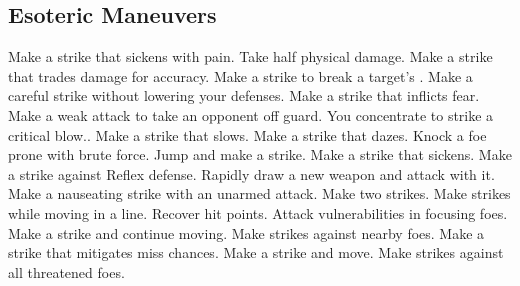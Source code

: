 
\small
\subsection{Esoteric Maneuvers}\label{Esoteric Maneuvers}
\begin{spelllist}
 Make a strike that sickens with pain.
 Take half physical damage.
 Make a strike that trades damage for accuracy.
 Make a strike to break a target's .
 Make a careful strike without lowering your defenses.
 Make a strike that inflicts fear.
 Make a weak attack to take an opponent off guard.
 You concentrate to strike a critical blow..
 Make a strike that slows.
 Make a strike that dazes.
 Knock a foe prone with brute force.
 Jump and make a strike.
 Make a strike that sickens.
 Make a strike against Reflex defense.
 Rapidly draw a new weapon and attack with it.
 Make a nauseating strike with an unarmed attack.
 Make two strikes.
 Make strikes while moving in a line.
 Recover hit points.
 Attack vulnerabilities in focusing foes.
 Make a strike and continue moving.
 Make strikes against nearby foes.
 Make a strike that mitigates miss chances.
 Make a strike and move.
 Make strikes against all threatened foes.
\end{spelllist}



\small

